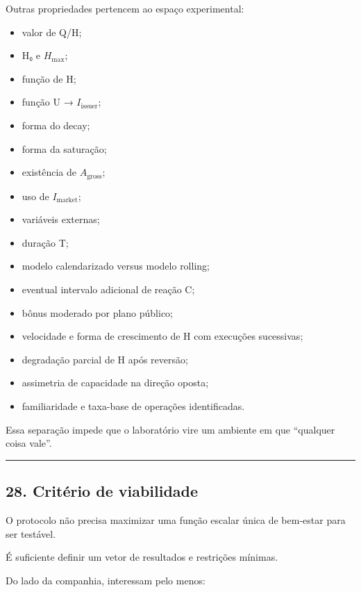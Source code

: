 \documentclass[
  a4paper,
]{article}
\providecommand{\tightlist}{%
  \setlength{\itemsep}{0pt}\setlength{\parskip}{0pt}}
\begin{document}
Outras propriedades pertencem ao espaço experimental:

\begin{itemize}
\tightlist
\item
  valor de Q/H;
\item
  H₀ e \(H_{\max}\);
\item
  função de H;
\item
  função U → \(I_{\mathrm{issuer}}\);
\item
  forma do decay;
\item
  forma da saturação;
\item
  existência de \(A_{\mathrm{gross}}\);
\item
  uso de \(I_{\mathrm{market}}\);
\item
  variáveis externas;
\item
  duração T;
\item
  modelo calendarizado versus modelo rolling;
\item
  eventual intervalo adicional de reação C;
\item
  bônus moderado por plano público;
\item
  velocidade e forma de crescimento de H com execuções sucessivas;
\item
  degradação parcial de H após reversão;
\item
  assimetria de capacidade na direção oposta;
\item
  familiaridade e taxa-base de operações identificadas.
\end{itemize}

Essa separação impede que o laboratório vire um ambiente em que
``qualquer coisa vale''.

\begin{center}\rule{0.5\linewidth}{0.5pt}\end{center}

\hypertarget{28-criterio-de-viabilidade}{}

\hypertarget{28-crituxe9rio-de-viabilidade}{%
\subsection{28. Critério de
viabilidade}\label{28-crituxe9rio-de-viabilidade}}

O protocolo não precisa maximizar uma função escalar única de bem-estar
para ser testável.

É suficiente definir um vetor de resultados e restrições mínimas.

Do lado da companhia, interessam pelo menos:
\end{document}
